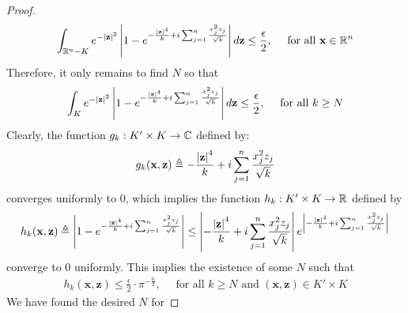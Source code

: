 \documentclass{report}
\begin{document}
\begin{proof}
\begin{align*}
  \int_{\mathbb{R}^n- K}  e^{- \left|\textbf{z}\right|^2} \left|1- e^{- \frac{\left|\textbf{z}\right|^4}{k}+ i\sum_{j=1}^n \frac{x_j^2z_j}{\sqrt{k} }}\right| d\textbf{z} \leq \frac{\epsilon}{2},\quad \text{ for all }\textbf{x}\in\mathbb{R}^n
\end{align*}
Therefore, it only remains to find $N$ so that 
\begin{align}
\label{EQpkn}
  \int_{K}   e^{- \left|\textbf{z}\right|^2} \left|1- e^{- \frac{\left|\textbf{z}\right|^4}{k}+ i\sum_{j=1}^n \frac{x_j^2z_j}{\sqrt{k} }}\right| d\textbf{z} \leq \frac{\epsilon}{2},\quad \text{ for all }k\geq N
\end{align}
Clearly, the function $g_k: K' \times K \rightarrow \mathbb{C}$ defined by:
\begin{align*}
g_k(\textbf{x},\textbf{z})\triangleq -\frac{\left|\textbf{z}\right|^4}{k} + i \sum_{j=1}^n \frac{x_j^2z_j}{\sqrt{k}}
\end{align*}
converges uniformly to  $0$, which implies the function $h_k:K'\times K\rightarrow \mathbb{R}$ defined by 
 \begin{align*}
   h_k(\textbf{x},\textbf{z})\triangleq \left|1- e^{- \frac{\left|\textbf{z}\right|^4}{k}+ i\sum_{j=1}^n \frac{x_j^2z_j}{\sqrt{k} }}\right| \leq   \left|- \frac{\left|\textbf{z}\right|^4}{k}+ i\sum_{j=1}^n \frac{x_j^2z_j}{\sqrt{k} } \right| e^{\left|- \frac{\left|\textbf{z}\right|^4}{k}+ i\sum_{j=1}^n \frac{x_j^2z_j}{\sqrt{k} }\right|}
\end{align*}
converge to $0$ uniformly. This implies the existence of some $N$ such that  
\begin{align*}
h_k(\textbf{x},\textbf{z})\leq \frac{\epsilon }{2}\cdot \pi ^{-\frac{n}{2}},\quad \text{ for all }k\geq N\text{ and }(\textbf{x},\textbf{z})\in K' \times K
\end{align*}
We have found the desired $N$ for  
\end{proof}
\end{document}
